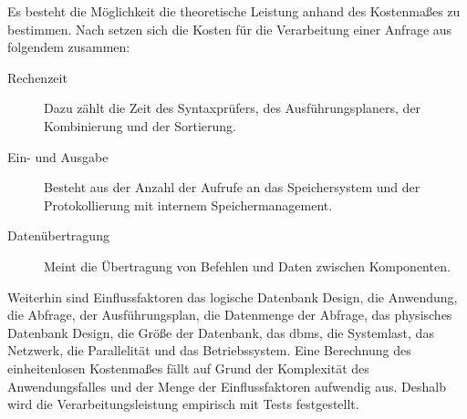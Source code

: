 Es besteht die Möglichkeit die theoretische Leistung anhand des Kostenmaßes zu bestimmen.
Nach \cite[S.300 f.]{book:kudrass} setzen sich die Kosten für die Verarbeitung einer Anfrage aus folgendem zusammen:
\begin{description}
\item[Rechenzeit] Dazu zählt die Zeit des Syntaxprüfers, des Ausführungsplaners, der Kombinierung und der Sortierung.
\item[Ein- und Ausgabe] Besteht aus der Anzahl der Aufrufe an das Speichersystem und der Protokollierung mit internem Speichermanagement.
\item[Datenübertragung] Meint die Übertragung von Befehlen und Daten zwischen Komponenten.
\end{description}
Weiterhin sind Einflussfaktoren das  logische Datenbank Design, die Anwendung, die Abfrage, der Ausführungsplan, die Datenmenge der Abfrage, das physisches Datenbank Design, die Größe der Datenbank, das \Gls{dbms}, die Systemlast, das Netzwerk, die  Parallelität und das Betriebssystem.
Eine Berechnung des einheitenlosen Kostenmaßes fällt auf Grund der Komplexität des Anwendungsfalles und der Menge der Einflussfaktoren aufwendig aus.
Deshalb wird die Verarbeitungsleistung empirisch mit Tests festgestellt.

